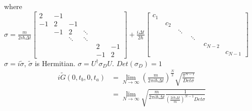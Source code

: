 \documentclass[a4paper,11pt]{article}
\begin{document}
where $\sigma=\frac{m}{2i\hbar\Delta t}\begin{bmatrix}
                2 & -1 & \quad & \quad & \quad & \quad \\
                -1 & 2 & -1 & \quad & \quad & \quad \\
                \quad & -1 & 2 & \ddots & \quad & \quad \\
                \quad & \quad & \ddots & \ddots & \quad & \quad \\
                \quad & \quad & \quad & \quad & 2 & -1 \\
                \quad & \quad & \quad & \quad & -1 & 2
              \end{bmatrix}+\frac{i\Delta t}{2\hbar}\begin{bmatrix}
                                                       c_1 & \quad & \quad & \quad & \quad & \quad \\
                                                       \quad & c_2 & \quad & \quad & \quad & \quad \\
                                                       \quad & \quad & \ddots & \quad & \quad & \quad \\
                                                       \quad & \quad & \quad & \ddots & \quad & \quad \\
                                                       \quad & \quad & \quad & \quad & c_{N-2} & \quad \\
                                                       \quad & \quad & \quad & \quad & \quad & c_{N-1}
                                                     \end{bmatrix}$
$\sigma=i\tilde{\sigma}$, $\tilde{\sigma}$ is Hermitian. $\sigma=U^\dag\sigma_DU$. $Det(\sigma_D)=1$
\begin{equation*}
  \begin{split}
     i\tilde{G}(0,t_b,0,t_a)&=\lim_{N\to\infty}\left(\frac{m}{2\pi i\hbar\Delta t}\right)^{\frac{N}{2}}\sqrt{\frac{\pi^{N-1}}{Det\sigma}}\\
       &=\lim_{N\to\infty}\sqrt{\frac{m}{2\pi i\hbar\Delta t}\frac{1}{\left(\frac{2i\hbar\Delta t}{m}\right)^{N-1}Det\sigma}}
  \end{split}
\end{equation*}
\end{document}
